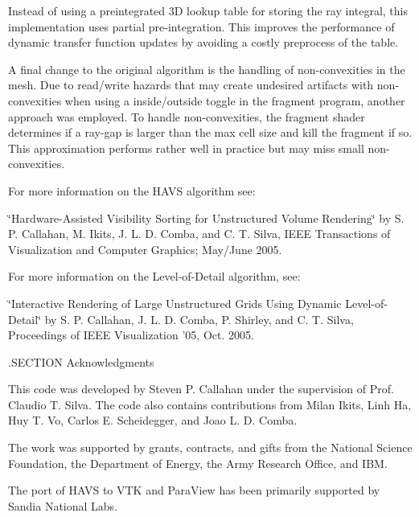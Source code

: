 Instead of using a preintegrated 3\-D lookup table for storing the ray integral, this implementation uses partial pre-\/integration. This improves the performance of dynamic transfer function updates by avoiding a costly preprocess of the table.

A final change to the original algorithm is the handling of non-\/convexities in the mesh. Due to read/write hazards that may create undesired artifacts with non-\/convexities when using a inside/outside toggle in the fragment program, another approach was employed. To handle non-\/convexities, the fragment shader determines if a ray-\/gap is larger than the max cell size and kill the fragment if so. This approximation performs rather well in practice but may miss small non-\/convexities.

For more information on the H\-A\-V\-S algorithm see\-:

\char`\"{}\-Hardware-\/\-Assisted Visibility Sorting for Unstructured Volume
 Rendering\char`\"{} by S. P. Callahan, M. Ikits, J. L. D. Comba, and C. T. Silva, I\-E\-E\-E Transactions of Visualization and Computer Graphics; May/\-June 2005.

For more information on the Level-\/of-\/\-Detail algorithm, see\-:

\char`\"{}\-Interactive Rendering of Large Unstructured Grids Using Dynamic
 Level-\/of-\/\-Detail\char`\"{} by S. P. Callahan, J. L. D. Comba, P. Shirley, and C. T. Silva, Proceedings of I\-E\-E\-E Visualization '05, Oct. 2005.

.S\-E\-C\-T\-I\-O\-N Acknowledgments

This code was developed by Steven P. Callahan under the supervision of Prof. Claudio T. Silva. The code also contains contributions from Milan Ikits, Linh Ha, Huy T. Vo, Carlos E. Scheidegger, and Joao L. D. Comba.

The work was supported by grants, contracts, and gifts from the National Science Foundation, the Department of Energy, the Army Research Office, and I\-B\-M.

The port of H\-A\-V\-S to V\-T\-K and Para\-View has been primarily supported by Sandia National Labs.

